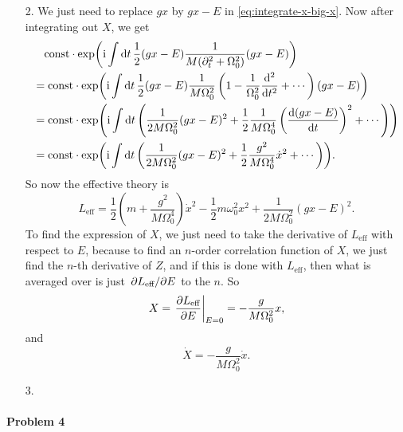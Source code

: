 \documentclass[hyperref, a4paper]{article}
\newcommand*{\ii}{\mathrm{i}}
\newcommand*{\const}{\mathrm{const}}
\begin{document}
\begin{itemize}
\item[2.] We just need to replace $gx$ by $gx - E$ in \eqref{eq:integrate-x-big-x}.
Now after integrating out $X$, we get 
\[
    \begin{aligned}
        &\quad \const \cdot \exp(\ii \int \dd{t} \frac{1}{2} 
        (g x - E) \frac{1}{M (\partial_t^2 + \Omega_0^2)} (gx - E)) \\
        &= \const \cdot \exp(\ii \int \dd{t} \frac{1}{2} (gx - E) \frac{1}{M \Omega_0^2} 
        \left( 1 - \frac{1}{\Omega_0^2} \dv[2]{t} + \cdots \right) (gx - E)) \\
        &= \const \cdot \exp(\ii \int \dd{t} \left(
            \frac{1}{2 M \Omega_0^2} (gx - E)^2 
            + \frac{1}{2} \frac{1}{M \Omega_0^4} \left(\dv{(gx - E)}{t}\right)^2 + \cdots
        \right)) \\
        &= \const \cdot \exp(\ii \int \dd{t} \left(
            \frac{1}{2 M \Omega_0^2} (gx - E)^2 
            + \frac{1}{2} \frac{g^2}{M \Omega_0^4} \dot{x}^2 + \cdots
        \right)).
    \end{aligned}
\]
So now the effective theory is 
\begin{equation}
    L_{\text{eff}} = \frac{1}{2} \left( m + \frac{g^2}{M \Omega_0^4} \right) \dot{x}^2 
    - \frac{1}{2} m \omega_0^2 x^2 + \frac{1}{2 M \Omega_0^2} (gx - E)^2 .
\end{equation}
To find the expression of $X$, we just need to take the derivative of $L_{\text{eff}}$ with respect to $E$,
because to find an $n$-order correlation function of $X$,
we just find the $n$-th derivative of $Z$, 
and if this is done with $L_{\text{eff}}$, 
then what is averaged over is just $\pdv*{L_{\text{eff}}}{E}$ to the $n$.
So 
\begin{equation}
    X = \eval{\pdv{L_{\text{eff}}}{E}}_{E=0} = - \frac{g}{M \Omega_0^2} x,
\end{equation}
and 
\begin{equation}
    \dot{X} = - \frac{g}{M \Omega_0^2} \dot{x}.
\end{equation}

\item[3.] 

\end{itemize}

\paragraph{Problem 4}
\end{document}
